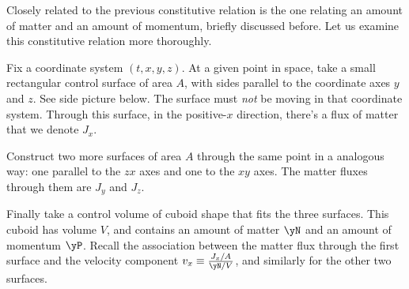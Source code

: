 \label{nsec:const_matter_momentum}

Closely related to the previous constitutive relation is the one {relating an amount of matter and an amount of momentum}, briefly discussed before. Let us examine this constitutive relation more thoroughly.

Fix a coordinate system $(t,x,y,z)$. At a given point in space, take a small rectangular control surface of area $A$, with sides parallel to the coordinate axes $y$ and $z$. See side picture below. The surface must \emph{not} be moving in that coordinate system. Through this surface, in the positive-$x$ direction, there's a flux of matter that we denote $J_{x}$.

Construct two more surfaces of area $A$ through the same point in a analogous way: one parallel to the $zx$ axes and one to the $xy$ axes. The matter fluxes through them are $J_{y}$ and $J_{z}$.

Finally take a control volume of cuboid shape that fits the three surfaces. This cuboid has volume $V$, and contains an amount of matter $\yN$ and an amount of momentum $\yP$. Recall the {association between the matter flux} through the first surface and the velocity component $v_{x} \equiv \frac{J_{x}/A}{\yN/V}$, and similarly for the other two surfaces.

%
%

